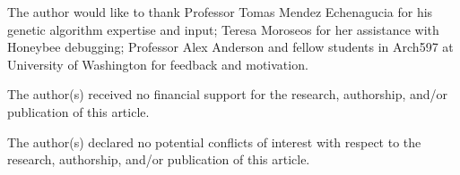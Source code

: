 \documentclass[sagev,times,Royal]{sagej}
\begin{document}
\begin{acks}
The author would like to thank Professor Tomas Mendez Echenagucia for his genetic algorithm expertise and input; Teresa Moroseos for her assistance with Honeybee debugging; Professor Alex Anderson and fellow students in Arch597 at University of Washington for feedback and motivation.
\end{acks}

\begin{funding}
The author(s) received no financial support for the research, authorship, and/or publication of this article.
\end{funding}

\begin{dci}
	The author(s) declared no potential conflicts of interest with respect to the research, authorship, and/or publication of this article.
\end{dci}



\end{document}
